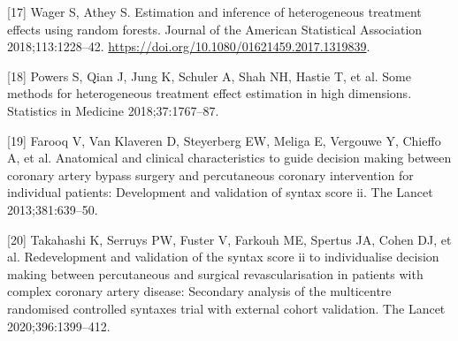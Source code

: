 \documentclass[]{elsarticle} %
\newenvironment{cslreferences}%
  {}%
  {\par}
\begin{document}
\begin{cslreferences}
\leavevmode\hypertarget{ref-Wager2018}{}%
{[}17{]} Wager S, Athey S. Estimation and inference of heterogeneous
treatment effects using random forests. Journal of the American
Statistical Association 2018;113:1228--42.
\url{https://doi.org/10.1080/01621459.2017.1319839}.

\leavevmode\hypertarget{ref-powers2018some}{}%
{[}18{]} Powers S, Qian J, Jung K, Schuler A, Shah NH, Hastie T, et al.
Some methods for heterogeneous treatment effect estimation in high
dimensions. Statistics in Medicine 2018;37:1767--87.

\leavevmode\hypertarget{ref-farooq2013anatomical}{}%
{[}19{]} Farooq V, Van Klaveren D, Steyerberg EW, Meliga E, Vergouwe Y,
Chieffo A, et al. Anatomical and clinical characteristics to guide
decision making between coronary artery bypass surgery and percutaneous
coronary intervention for individual patients: Development and
validation of syntax score ii. The Lancet 2013;381:639--50.

\leavevmode\hypertarget{ref-takahashi2020redevelopment}{}%
{[}20{]} Takahashi K, Serruys PW, Fuster V, Farkouh ME, Spertus JA,
Cohen DJ, et al. Redevelopment and validation of the syntax score ii to
individualise decision making between percutaneous and surgical
revascularisation in patients with complex coronary artery disease:
Secondary analysis of the multicentre randomised controlled syntaxes
trial with external cohort validation. The Lancet 2020;396:1399--412.
\end{cslreferences}

\setlength{\parindent}{0in}
\setlength{\leftskip}{0in}

\noindent
\end{document}

